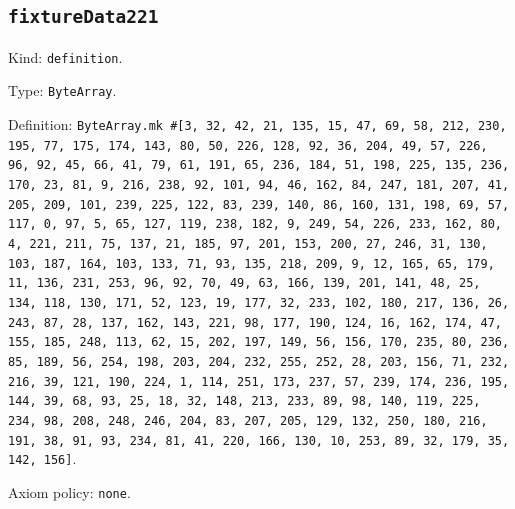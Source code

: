 \documentclass[11pt]{article}
\begin{document}
\subsection*{\texttt{fixtureData221}}
\noindent Kind: \texttt{definition}.\par
\noindent Type: \texttt{ByteArray}.\par
\noindent Definition: \texttt{ByteArray.mk \#[3, 32, 42, 21, 135, 15, 47, 69, 58, 212, 230, 195, 77, 175, 174, 143, 80, 50, 226, 128, 92, 36, 204, 49, 57, 226, 96, 92, 45, 66, 41, 79, 61, 191, 65, 236, 184, 51, 198, 225, 135, 236, 170, 23, 81, 9, 216, 238, 92, 101, 94, 46, 162, 84, 247, 181, 207, 41, 205, 209, 101, 239, 225, 122, 83, 239, 140, 86, 160, 131, 198, 69, 57, 117, 0, 97, 5, 65, 127, 119, 238, 182, 9, 249, 54, 226, 233, 162, 80, 4, 221, 211, 75, 137, 21, 185, 97, 201, 153, 200, 27, 246, 31, 130, 103, 187, 164, 103, 133, 71, 93, 135, 218, 209, 9, 12, 165, 65, 179, 11, 136, 231, 253, 96, 92, 70, 49, 63, 166, 139, 201, 141, 48, 25, 134, 118, 130, 171, 52, 123, 19, 177, 32, 233, 102, 180, 217, 136, 26, 243, 87, 28, 137, 162, 143, 221, 98, 177, 190, 124, 16, 162, 174, 47, 155, 185, 248, 113, 62, 15, 202, 197, 149, 56, 156, 170, 235, 80, 236, 85, 189, 56, 254, 198, 203, 204, 232, 255, 252, 28, 203, 156, 71, 232, 216, 39, 121, 190, 224, 1, 114, 251, 173, 237, 57, 239, 174, 236, 195, 144, 39, 68, 93, 25, 18, 32, 148, 213, 233, 89, 98, 140, 119, 225, 234, 98, 208, 248, 246, 204, 83, 207, 205, 129, 132, 250, 180, 216, 191, 38, 91, 93, 234, 81, 41, 220, 166, 130, 10, 253, 89, 32, 179, 35, 142, 156]}.\par
\noindent Axiom policy: \texttt{none}.\par
\end{document}

